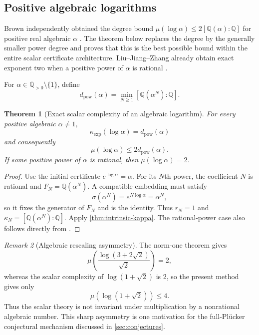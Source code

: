 \documentclass[11pt]{article}
\newcommand{\QQ}{\mathbb Q}
\newcommand{\Qbar}{\overline{\mathbb Q}}
\newtheorem{theorem}{Theorem}[section]
\theoremstyle{definition}
\theoremstyle{remark}
\newtheorem{remark}[theorem]{Remark}
\numberwithin{equation}{section}
\begin{document}
\subsection{Positive algebraic logarithms}

Brown independently obtained the degree bound
$\mu(\log\alpha)\le2[\QQ(\alpha):\QQ]$ for positive real algebraic
$\alpha$ \cite[Proposition~5.1]{Brown2026}.  The theorem below replaces
the degree by the generally smaller power degree and proves that this is
the best possible bound within the entire scalar certificate
architecture.  Liu--Jiang--Zhang already obtain exact exponent two when
a positive power of $\alpha$ is rational
\cite[Corollary~7]{LiuJiangZhang2026}.

For $\alpha\in\Qbar_{>0}\setminus\{1\}$, define
\begin{equation}\label{eq:power-degree-new}
 d_{\mathrm{pow}}(\alpha)=
 \min_{N\ge1}[\QQ(\alpha^N):\QQ].
\end{equation}

\begin{theorem}[Exact scalar complexity of an algebraic logarithm]
\label{thm:alglog-complexity}
For every positive algebraic $\alpha\ne1$,
\[
 \boxed{
 \kappa_{\exp}(\log\alpha)=d_{\mathrm{pow}}(\alpha)}
\]
and consequently
\[
 \boxed{
 \mu(\log\alpha)\le2d_{\mathrm{pow}}(\alpha).}
\]
If some positive power of $\alpha$ is rational, then
$\mu(\log\alpha)=2$.
\end{theorem}

\begin{proof}
Use the initial certificate $e^{\log\alpha}=\alpha$.  For its $N$th
power, the coefficient $N$ is rational and
$F_N=\QQ(\alpha^N)$.  A compatible embedding must satisfy
\[
 \sigma(\alpha^N)=e^{N\log\alpha}=\alpha^N,
\]
so it fixes the generator of $F_N$ and is the identity.  Thus $r_N=1$
and $\kappa_N=[\QQ(\alpha^N):\QQ]$.  Apply
\cref{thm:intrinsic-kappa}.  The rational-power case also follows
directly from \cite[Corollary~7]{LiuJiangZhang2026}.
\end{proof}

\begin{remark}[Algebraic rescaling asymmetry]
The norm-one theorem gives
\[
 \mu\!\left(\frac{\log(3+2\sqrt2)}{\sqrt2}\right)=2,
\]
whereas the scalar complexity of $\log(1+\sqrt2)$ is $2$, so the present
method gives only
\[
 \mu(\log(1+\sqrt2))\le4.
\]
Thus the scalar theory is not invariant under multiplication by a
nonrational algebraic number.  This sharp asymmetry is one motivation
for the full-Pl\"ucker conjectural mechanism discussed in
\cref{sec:conjectures}.
\end{remark}
\end{document}
